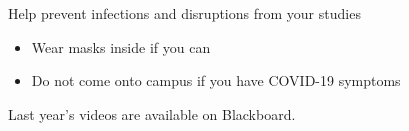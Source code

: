 \begin{frame}{Help prevent infections and disruptions from your studies}
\begin{itemize}
\item Wear masks inside if you can
\item Do not come onto campus if you have COVID-19 symptoms
\end{itemize}

\begin{block}{Last year's videos are available on Blackboard.}
\end{block}
\end{frame}
